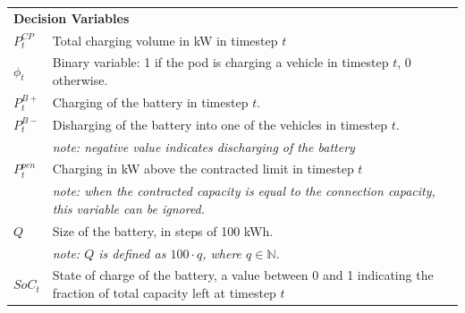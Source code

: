 \documentclass{article}
\begin{document}
\begin{table}[h!]
{\begin{tabular}{ll}
                  \multicolumn{2}{l}{\textbf{Decision Variables}}                                                                                                                     \\
                  $P^{CP}_{t}$          & Total charging volume in kW in timestep $t$                                                                                                 \\
                  $\phi_{t}$            & Binary variable: 1 if the pod is charging a vehicle in timestep $t$, 0 otherwise.                                                           \\
                  $P^{B+}_t$            & Charging of the battery in timestep $t$.\                                                                                                   \\
                  $P^{B-}_t$            & Disharging of the battery into one of the vehicles in timestep $t$.\                                                                        \\
                                        & \textit{note: negative value indicates discharging of the battery}                                                                          \\ [2pt]
                  $P^{pen}_{t}$         & Charging in kW above the contracted limit in timestep $t$                                                                                   \\
                                        & \textit{note: when the contracted capacity is equal to the connection capacity, this variable can be ignored.}                              \\ [2pt]
                  $Q$                   & Size of the battery, in steps of 100 kWh.                                                                                                   \\
                                        & \textit{note: $Q$ is defined as $100 \cdot q$, where $q \in \mathbb{N}$.}                                                                   \\ [2pt]
                  $SoC_t$               & State of charge of the battery, a value between 0 and 1 indicating the fraction of total capacity left at timestep $t$                      \\[4pt]


                  \bottomrule
            \end{tabular}%
      }
\end{table}
\pagebreak
\end{document}
